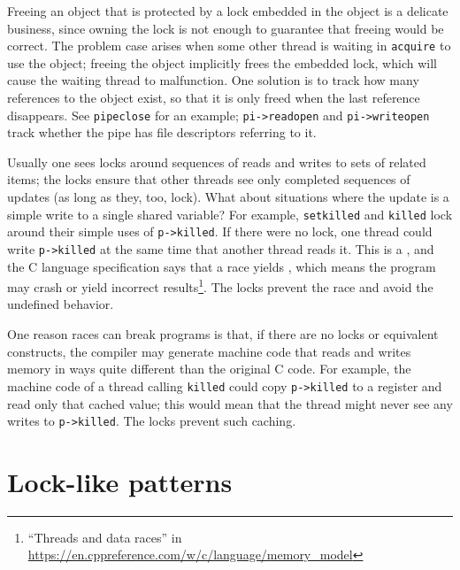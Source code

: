 Freeing an object that is protected by a lock embedded in the object
is a delicate business, since owning the lock is
not enough to guarantee that freeing would be correct. The problem
case arises when some other thread is waiting in {\tt acquire} to use
the object; freeing the object implicitly frees the embedded lock, which will
cause the waiting thread to malfunction. One solution is to track how
many references to the object exist, so that it is only freed when the
last reference disappears. See {\tt pipeclose}
 for an example;
{\tt pi->readopen} and {\tt pi->writeopen} track whether
the pipe has file descriptors referring to it.

Usually one sees locks around sequences of reads and writes to sets of related
items; the locks ensure that other threads see only completed sequences of
updates (as long as they, too, lock).
What about situations where the update is a simple write to a
single shared variable? For example, 
\texttt{setkilled} and \texttt{killed}
lock around their simple uses of
\lstinline{p->killed}.
If there were no lock, one thread could write 
\lstinline{p->killed}
at the same time that another thread reads it.
This is a , and the C language specification says
that a race yields , which means the
program may crash or yield incorrect results\footnote{``Threads and
data races'' in \url{
https://en.cppreference.com/w/c/language/memory_model}}. The locks
prevent the race and avoid the undefined behavior.

One reason races can break programs is that, if there are no
locks or equivalent constructs, the compiler may generate machine code
that reads and writes memory in ways quite different than
the original C code. For example, the machine code
of a thread calling
\texttt{killed} could copy \lstinline{p->killed} to a register and
read only that cached value; this would mean that the thread
might never see any writes to
\lstinline{p->killed}. The locks prevent such caching.


\section{Lock-like patterns}

